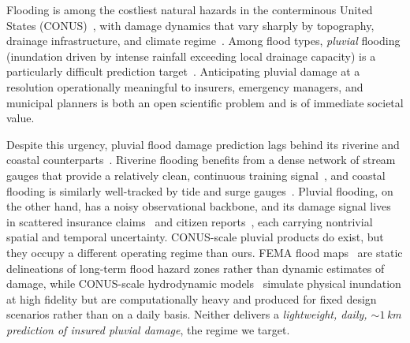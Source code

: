 Flooding is among the costliest natural hazards in the conterminous United States (CONUS)~\cite{fema_cost_of_flooding}, with damage dynamics that vary sharply by topography, drainage infrastructure, and climate regime~\cite{brunner_spatial_2020}.
%
Among flood types, \emph{pluvial} flooding (inundation driven by intense rainfall exceeding local drainage capacity) is a particularly difficult prediction target~\cite{rosenzweig_pluvial_2018,nelson-mercer_pluvial_2025}.
%
%
Anticipating pluvial damage at a resolution operationally meaningful to insurers, emergency managers, and municipal planners is both an open scientific problem and is  of immediate societal value.

Despite this urgency, pluvial flood damage prediction lags behind its riverine and coastal counterparts~\cite{rosenzweig_pluvial_2018}.
%
Riverine flooding benefits from a dense network of stream gauges that provide a relatively clean, continuous training signal~\cite{boutayeb_when_2025,nearing_global_2024}, and coastal flooding is similarly well-tracked by tide and surge gauges~\cite{bates_combined_2021,yang_predicting_2022}.
%
Pluvial flooding, on the other hand, has a noisy observational backbone, and its damage signal lives in scattered insurance claims~\cite{fema_nfip_claims_v2} and citizen reports~\cite{puttinaovarat_flood_2020,mayo_groundsource_2026}, each carrying nontrivial spatial and temporal uncertainty.
%
CONUS-scale pluvial products do exist, but they occupy a different operating regime than ours.
%
FEMA flood maps~\cite{fema_flood_zone_2021} are static delineations of long-term flood hazard zones rather than dynamic estimates of damage, while CONUS-scale hydrodynamic models~\cite{wing_30_2024,bates_combined_2021} simulate physical inundation at high fidelity but are computationally heavy and produced for fixed design scenarios rather than on a daily basis.
%
Neither delivers a \emph{lightweight, daily, ${\sim}1$\,km prediction of insured pluvial damage}, the regime we target.

